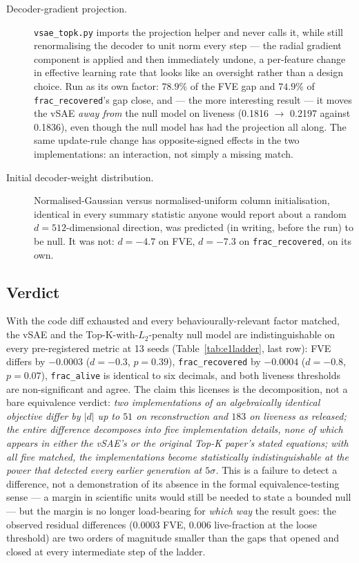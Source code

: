\documentclass[11pt]{article}
\begin{document}
\begin{description}
\item[Decoder-gradient projection.] \texttt{vsae\_topk.py} imports the
  projection helper 
  and never calls it, while still renormalising the decoder to unit norm every step --- the
  radial gradient component is applied and then immediately undone, a
  per-feature change in effective learning rate that looks like an oversight
  rather than a design choice. Run as its own factor: $78.9\%$ of the FVE gap
  and $74.9\%$ of \texttt{frac\_recovered}'s gap close, and --- the more
  interesting result --- it moves the vSAE \emph{away from} the null model on
  liveness (0.1816 $\to$ 0.2197 against 0.1836), even though the null model
  has had the projection all along. The same update-rule change has
  opposite-signed effects in the two implementations: an interaction, not
  simply a missing match.
\item[Initial decoder-weight distribution.] Normalised-Gaussian versus
  normalised-uniform column initialisation, identical in every summary
  statistic anyone would report about a random $d=512$-dimensional direction,
  was predicted (in writing, before the run) to be null. It was not: $d=-4.7$
  on FVE, $d=-7.3$ on \texttt{frac\_recovered}, on its own.
\end{description}

\subsection{Verdict}

With the code diff exhausted and every behaviourally-relevant factor matched,
the vSAE and the Top-K-with-$L_2$-penalty null model are indistinguishable
on every pre-registered metric at 13 seeds (Table~\ref{tab:e1ladder}, last
row): FVE differs by $-0.0003$ ($d=-0.3$, $p=0.39$), \texttt{frac\_recovered}
by $-0.0004$ ($d=-0.8$, $p=0.07$), \texttt{frac\_alive} is identical to six
decimals, and both liveness thresholds are non-significant and agree. The
claim this licenses is the decomposition, not a bare equivalence verdict:
\emph{two implementations of an algebraically identical objective differ by
$|d|$ up to $51$ on reconstruction and $183$ on liveness as released; the
entire difference decomposes into five implementation details,
none of which appears in either the vSAE's or the original Top-K paper's
stated equations; with all five matched, the implementations become
statistically indistinguishable at the power that detected every earlier
generation at $5\sigma$.} This is a failure to detect a difference, not a
demonstration of its absence in the formal equivalence-testing sense --- a
margin in scientific units would still be needed to state a bounded null ---
but the margin is no longer load-bearing for \emph{which way} the result
goes: the observed residual differences (0.0003 FVE, 0.006 live-fraction at
the loose threshold) are two orders of magnitude smaller than the gaps that
opened and closed at every intermediate step of the ladder.
\end{document}
